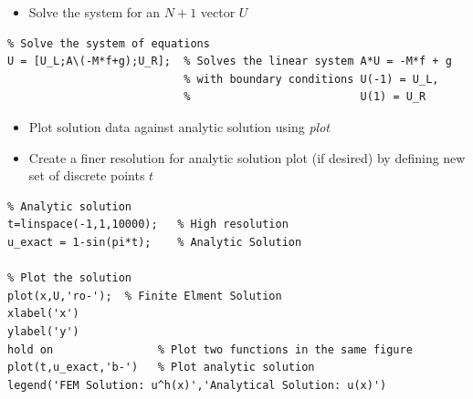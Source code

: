 \documentclass[12pt]{report}
\begin{document}
\begin{itemize}
\item Solve the system for an $N+1$ vector $U$
\end{itemize}
\begin{lstlisting}
% Solve the system of equations
U = [U_L;A\(-M*f+g);U_R];  % Solves the linear system A*U = -M*f + g 
                           % with boundary conditions U(-1) = U_L, 
                           %                          U(1) = U_R
\end{lstlisting}

\begin{itemize}
\item Plot solution data against analytic solution using \textit{plot}
\item Create a finer resolution for analytic solution plot (if desired) by defining new set of discrete points $t$
\end{itemize}

\begin{lstlisting}
% Analytic solution 
t=linspace(-1,1,10000);   % High resolution  
u_exact = 1-sin(pi*t);    % Analytic Solution 

% Plot the solution 
plot(x,U,'ro-');  % Finite Elment Solution 
xlabel('x')
ylabel('y')
hold on                % Plot two functions in the same figure
plot(t,u_exact,'b-')   % Plot analytic solution
legend('FEM Solution: u^h(x)','Analytical Solution: u(x)')
\end{lstlisting}
\end{document}
